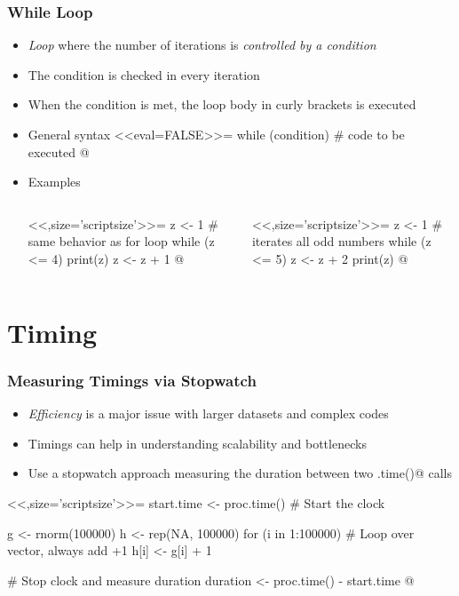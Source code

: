 \documentclass[%
  final,
  11pt, 
  show notes, %
  t, %
  fleqn, %
]{beamer}
\begin{document}

\begin{frame}[fragile]
  \frametitle{While Loop}
\begin{itemize}
\item \emph{Loop} where the number of iterations is \emph{controlled by a condition}
\item The condition is checked in every iteration
\item When the condition is met, the loop body in curly brackets is executed 
\item General syntax
<<eval=FALSE>>=
while (condition) {
  # code to be executed
}
@
\item Examples
\begin{columns}[T]
\begin{column}{.4\textwidth}
<<,size='scriptsize'>>= 
z <- 1
# same behavior as for loop
while (z <= 4) { 
    print(z)  
    z <- z + 1
}
@
\end{column}
\begin{column}{.4\textwidth}
<<,size='scriptsize'>>= 
z <- 1
# iterates all odd numbers
while (z <= 5) { 
    z <- z + 2
    print(z)  
}
@
\end{column}
\end{columns}
\end{itemize}
\end{frame}

\section{Timing}


\begin{frame}[fragile]
  \frametitle{Measuring Timings via Stopwatch}
\begin{itemize}
\item \emph{Efficiency} is a major issue with larger datasets and complex codes
\item Timings can help in understanding scalability and bottlenecks 
\item Use a stopwatch approach measuring the duration between two \verb@proc.time()@ calls
\end{itemize}	
<<,size='scriptsize'>>=  
start.time <- proc.time() # Start the clock

g <- rnorm(100000)
h <- rep(NA, 100000)
for (i in 1:100000) { # Loop over vector, always add +1
  h[i] <- g[i] + 1
}

# Stop clock and measure duration
duration <- proc.time() - start.time
@
\end{frame}
\end{document}
